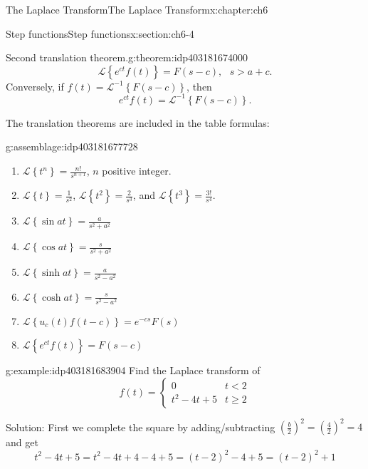 \documentclass[oneside,10pt,]{book}
\numberwithin{equation}{section}
\numberwithin{equation}{section}
\newcommand{\lt}{<}
\newcommand{\amp}{&}
\begin{document}
\begin{chapterptx}{The Laplace Transform}{}{The Laplace Transform}{}{}{x:chapter:ch6}
\begin{sectionptx}{Step functions}{}{Step functions}{}{}{x:section:ch6-4}
\begin{theorem}{Second translation theorem.}{}{g:theorem:idp403181674000}
\begin{equation*}
\mathcal{L}\left\{ e^{ct}f\left(t\right)\right\} =F(s-c),\,\,\,\,s>a+c.
\end{equation*}
Conversely, if \(f(t)=\mathcal{L}^{-1}\left\{ F(s-c)\right\} \), then%
\begin{equation*}
e^{ct}f(t)=\mathcal{L}^{-1}\left\{ F(s-c)\right\} .
\end{equation*}
%
\end{theorem}
The translation theorems are included in the table formulas:%
\begin{assemblage}{}{g:assemblage:idp403181677728}%
%
\begin{enumerate}
\item{}\(\mathcal{L}\left\{ t^{n}\right\} =\frac{n!}{s^{n+1}}\), \(n\) positive integer.%
\item{}\(\mathcal{L}\left\{ t\right\} =\frac{1}{s^{2}}\), \(\mathcal{L}\left\{ t^{2}\right\} =\frac{2}{s^{3}}\), and \(\mathcal{L}\left\{ t^{3}\right\} =\frac{3!}{s^{4}}\).%
\item{}\(\displaystyle \mathcal{L}\left\{ \sin at\right\} =\frac{a}{s^{2}+a^{2}}\)%
\item{}\(\displaystyle \mathcal{L}\left\{ \cos at\right\} =\frac{s}{s^{2}+a^{2}}\)%
\item{}\(\displaystyle \mathcal{L}\left\{ \sinh at\right\} =\frac{a}{s^{2}-a^{2}}\)%
\item{}\(\displaystyle \mathcal{L}\left\{ \cosh at\right\} =\frac{s}{s^{2}-a^{2}}\)%
\item{}\(\displaystyle \mathcal{L}\left\{ u_{c}(t)f\left(t-c\right)\right\} =e^{-cs}F(s)\)%
\item{}\(\displaystyle \mathcal{L}\left\{ e^{ct}f\left(t\right)\right\} =F(s-c)\)%
\end{enumerate}
%
\end{assemblage}
\begin{example}{}{g:example:idp403181683904}%
Find the Laplace transform of%
\begin{equation*}
f(t)=\begin{cases}
0 \amp t\lt 2\\
t^{2}-4t+5 \amp t\geq2
\end{cases}
\end{equation*}
%
\par
Solution: First we complete the square by adding\slash{}subtracting \(\left(\frac{b}{2}\right)^{2}=\left(\frac{4}{2}\right)^{2}=4\) and get%
\begin{equation*}
t^{2}-4t+5=t^{2}-4t+4-4+5=\left(t-2\right)^{2}-4+5=(t-2)^{2}+1

\end{equation*}
\end{example}
\end{sectionptx}
\end{chapterptx}
\end{document}
